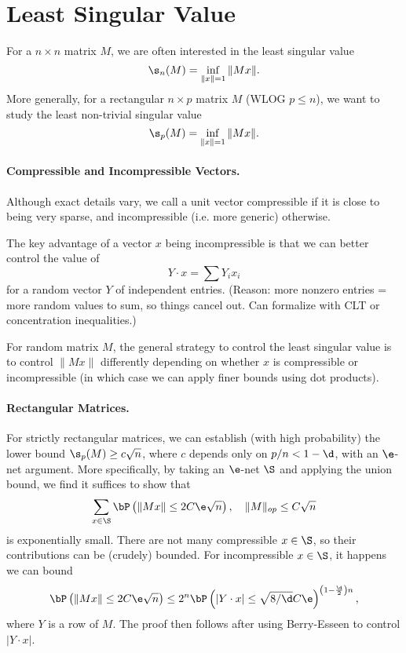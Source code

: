 \section*{Least Singular Value}

For a $n \times n$ matrix $M$, we are often interested in the least singular value
\[
    \s_n(M) = \inf_{\|x\| = 1}\|Mx\|.
\]
More generally, for a rectangular $n \times p$ matrix $M$ (WLOG $p \le n$), we want to study the least non-trivial singular value
\[
    \s_p(M) = \inf_{\|x\| = 1}\|Mx\|.
\]

\paragraph{Compressible and Incompressible Vectors.} Although exact details vary, we call a unit vector compressible if it is close to being very sparse, and incompressible (i.e. more generic) otherwise.

The key advantage of a vector $x$ being incompressible is that we can better control the value of
\[
    Y \cdot x = \sum Y_ix_i
\]
for a random vector $Y$ of independent entries. (Reason: more nonzero entries = more random values to sum, so things cancel out. Can formalize with CLT or concentration inequalities.)

For random matrix $M$, the general strategy to control the least singular value is to control $\|Mx\|$ differently depending on whether $x$ is compressible or incompressible (in which case we can apply finer bounds using dot products).

\paragraph{Rectangular Matrices.} For strictly rectangular matrices, we can establish (with high probability) the lower bound $\s_p(M) \ge c \sqrt{n}$, where $c$ depends only on $p/n < 1 - \d$, with an $\e$-net argument. More specifically, by taking an $\e$-net $\S$ and applying the union bound, we find it suffices to show that
\[
    \sum_{x \in \S} \bP\left( \|Mx\| \le 2C\e\sqrt{n} \right), \quad \|M\|_{op} \le C\sqrt{n}
\]
is exponentially small. There are not many compressible $x \in \S$, so their contributions can be (crudely) bounded. For incompressible $x \in \S$, it happens we can bound
\[
    \bP\left( \|Mx\| \le 2C\e\sqrt{n} \right) \le 2^n \bP\left( |Y \cdot x| \le \sqrt{8/\d}C\e \right)^{\left( 1 - \frac{\d}{2} \right)n},
\]
where $Y$ is a row of $M$. The proof then follows after using Berry-Esseen to control $|Y \cdot x|$.

